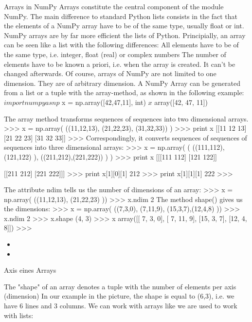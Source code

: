 Arrays in NumPy
Arrays constitute the central component of the module NumPy. 
The main difference to standard Python lists consists in the fact that the elements of a NumPy array have to be of the same type, usually float or int. NumPy arrays are by far more efficient the lists of Python. Principially, an array can be seen like a list with the following differences:
All elements have to be of the same type, i.e. integer, float (real) or complex numbers
The number of elements have to be known a priori, i.e. when the array is created. It can't be changed afterwards.
Of course, arrays of NumPy are not limited to one dimension. They are of arbitrary dimension. 
A NumPy Array can be generated from a list or a tuple with the array-method, as shown in the following example: 
$ import numpy as np
$ x = np.array([42,47,11], int)
$ x
$ array([42, 47, 11])

The array method transforms sequences of sequences into two dimensional arrays.
>>> x = np.array( ((11,12,13), (21,22,23), (31,32,33)) )
>>> print x
[[11 12 13]
 [21 22 23]
 [31 32 33]]
>>> 
Correspondingly, it converts sequences of sequences of sequences into three dimensional arrays:
>>> x = np.array( ( ((111,112), (121,122) ), ((211,212),(221,222)) ) )
>>> print x
[[[111 112]
  [121 122]]

 [[211 212]
  [221 222]]]
>>> print x[1][0][1]
212
>>> print x[1][1][1]
222
>>> 

The attribute ndim tells us the number of dimensions of an array:
>>> x = np.array( ((11,12,13), (21,22,23) ))
>>> x.ndim
2
The method shape() gives us the dimensions:
>>> x = np.array( ((7,3,0), (7,11,9), (15,3,7),(12,4,8)  ))
>>> x.ndim
2
>>> x.shape
(4, 3)
>>> x
array([[ 7,  3,  0],
       [ 7, 11,  9],
       [15,  3,  7],
       [12,  4,  8]])
>>> 






\begin{itemize}
\item
\item
\end{itemize}

Axis eines Arrays

The "shape" of an array denotes a tuple with the number of elements per axis (dimension) In our example in the picture, the shape is equal to (6,3), i.e. we have 6 lines and 3 columns. 
We can work with arrays like we are used to work with lists: 


